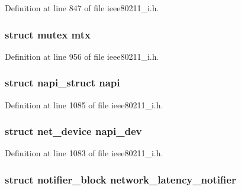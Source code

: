 Definition at line 847 of file ieee80211\-\_\-i.\-h.

\hypertarget{structieee80211__local_a06f637951b74c996f2e4987a7be1dbdd}{
\subsubsection[{mtx}]{\setlength{\rightskip}{0pt plus 5cm}struct mutex mtx}}\label{structieee80211__local_a06f637951b74c996f2e4987a7be1dbdd}


Definition at line 956 of file ieee80211\-\_\-i.\-h.

\hypertarget{structieee80211__local_ad7946e6f4ab63e48db691b15b9a961d5}{
\subsubsection[{napi}]{\setlength{\rightskip}{0pt plus 5cm}struct napi\-\_\-struct napi}}\label{structieee80211__local_ad7946e6f4ab63e48db691b15b9a961d5}


Definition at line 1085 of file ieee80211\-\_\-i.\-h.

\hypertarget{structieee80211__local_aac1852a9def07663ebe91ac3d74cc313}{
\subsubsection[{napi\-\_\-dev}]{\setlength{\rightskip}{0pt plus 5cm}struct net\-\_\-device napi\-\_\-dev}}\label{structieee80211__local_aac1852a9def07663ebe91ac3d74cc313}


Definition at line 1083 of file ieee80211\-\_\-i.\-h.

\hypertarget{structieee80211__local_a0bcd7033eb509ae3bb60ce10a09a48b3}{
\subsubsection[{network\-\_\-latency\-\_\-notifier}]{\setlength{\rightskip}{0pt plus 5cm}struct notifier\-\_\-block network\-\_\-latency\-\_\-notifier}}\label{structieee80211__local_a0bcd7033eb509ae3bb60ce10a09a48b3}


